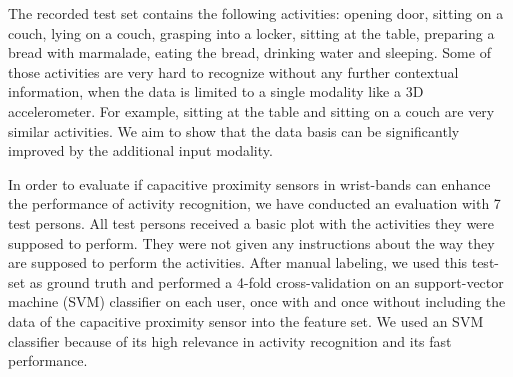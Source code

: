 \documentclass[runningheads,a4paper]{llncs}
\begin{document}
The recorded test set contains the following activities: opening door, sitting on a couch, lying on a couch, grasping into a locker, sitting at the table, preparing a bread with marmalade, eating the bread, drinking water and sleeping. Some of those activities are very hard to recognize without any further contextual information, when the data is limited to a single modality like a 3D accelerometer. For example, sitting at the table and sitting on a couch are very similar activities. We aim to show that the data basis can be significantly improved by the additional input modality. 

In order to evaluate if capacitive proximity sensors in wrist-bands can enhance the performance of activity recognition, we have conducted an evaluation with 7 test persons. All test persons received a basic plot with the activities they were supposed to perform. They were not given any instructions about the way they are supposed to perform the activities. After manual labeling, we used this test-set as ground truth and performed a 4-fold cross-validation on an support-vector machine (SVM) classifier on each user, once with and once without including the data of the capacitive proximity sensor into the feature set. We used an SVM classifier because of its high relevance in activity recognition and its fast performance. 

\end{document}
